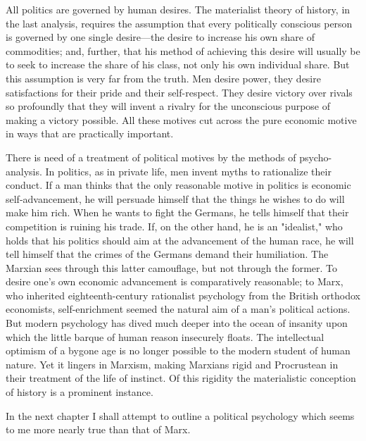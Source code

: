 All politics are governed by human desires. The materialist theory of history, in the last analysis, requires the assumption that every politically conscious person is governed by one single desire---the desire to increase his own share of commodities; and, further, that his method of achieving this desire will usually be to seek to increase the share of his class, not only his own individual share. But this assumption is very far from the truth. Men desire power, they desire satisfactions for their pride and their self-respect. They desire victory over rivals so profoundly that they will invent a rivalry for the unconscious purpose of making a victory possible. All these motives cut across the pure economic motive in ways that are practically important.

There is need of a treatment of political motives by the methods of psycho-analysis. In politics, as in private life, men invent myths to rationalize their conduct. If a man thinks that the only reasonable motive in politics is economic self-advancement, he will persuade himself that the things he wishes to do will make him rich. When he wants to fight the Germans, he tells himself that their competition is ruining his trade. If, on the other hand, he is an "idealist," who holds that his politics should aim at the advancement of the human race, he will tell himself that the crimes of the Germans demand their humiliation. The Marxian sees through this latter camouflage, but not through the former. To desire one's own economic advancement is comparatively reasonable; to Marx, who inherited eighteenth-century rationalist psychology from the British orthodox economists, self-enrichment seemed the natural aim of a man's political actions. But modern psychology has dived much deeper into the ocean of insanity upon which the little barque of human reason insecurely floats. The intellectual optimism of a bygone age is no longer possible to the modern student of human nature. Yet it lingers in Marxism, making Marxians rigid and Procrustean in their treatment of the life of instinct. Of this rigidity the materialistic conception of history is a prominent instance.

In the next chapter I shall attempt to outline a political psychology which seems to me more nearly true than that of Marx.